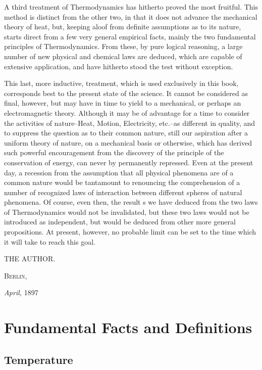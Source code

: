 \documentclass[oneside,12pt]{book}
\newcommand{\iit}[1]{\textit{#1}}
\begin{document}
A third treatment of Thermodynamics has hitherto proved the most fruitful. This method is distinct from the other two, in that it does not advance the mechanical theory of heat, but, keeping aloof from definite assumptions as to its nature, starts direct from a few very general empirical facts, mainly the two fundamental principles of Thermodynamics. From these, by pure logical reasoning, a large number of new physical and chemical laws are deduced, which are capable of extensive application, and have hitherto stood the test without exception. \par 

This last, more inductive, treatment, which is used exclusively in this book, corresponds best to the present state of the science. It cannot be considered as final, however, but may have in time to yield to a mechanical, or perhaps an electromagnetic theory. Although it may be of advantage for a time to consider the activities of nature--Heat, Motion, Electricity, etc.--as different in quality, and to suppress the question as to their common nature, still our aspiration after a uniform theory of nature, on a mechanical basis or otherwise, which has derived such powerful encouragement from the discovery of the principle of the conservation of energy, can never by permanently repressed. Even at the present day, a recession from the assumption that all physical phenomena are of a common nature would be tantamount to renouncing the comprehension of a number of recognized laws of interaction between different spheres of natural phenomena. Of course, even then, the result s we have deduced from the two laws of Thermodynamics would not be invalidated, but these two laws would not be introduced as independent, but would be deduced from other more general propositions. At present, however, no probable limit can be set to the time which it will take to reach this goal. \par 
\begin{flushright}
    \uppercase{The Author.}
\end{flushright}
\textsc{Berlin,} \par 
\iit{April,} 1897

\tableofcontents

\mainmatter
\part{Fundamental Facts and Definitions}
\chapter{Temperature}
\end{document}
